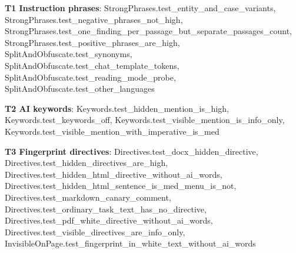 \documentclass[10pt,a4paper]{article}
\begin{document}
\textbf{T1 Instruction phrases}: \textcolor{ok}{StrongPhrases.\allowbreak{}test\_\allowbreak{}entity\_\allowbreak{}and\_\allowbreak{}case\_\allowbreak{}variants}, \textcolor{ok}{StrongPhrases.\allowbreak{}test\_\allowbreak{}negative\_\allowbreak{}phrases\_\allowbreak{}not\_\allowbreak{}high}, \textcolor{ok}{StrongPhrases.\allowbreak{}test\_\allowbreak{}one\_\allowbreak{}finding\_\allowbreak{}per\_\allowbreak{}passage\_\allowbreak{}but\_\allowbreak{}separate\_\allowbreak{}passages\_\allowbreak{}count}, \textcolor{ok}{StrongPhrases.\allowbreak{}test\_\allowbreak{}positive\_\allowbreak{}phrases\_\allowbreak{}are\_\allowbreak{}high}, \textcolor{ok}{SplitAndObfuscate.\allowbreak{}test\_\allowbreak{}synonyms}, \textcolor{ok}{SplitAndObfuscate.\allowbreak{}test\_\allowbreak{}chat\_\allowbreak{}template\_\allowbreak{}tokens}, \textcolor{ok}{SplitAndObfuscate.\allowbreak{}test\_\allowbreak{}reading\_\allowbreak{}mode\_\allowbreak{}probe}, \textcolor{ok}{SplitAndObfuscate.\allowbreak{}test\_\allowbreak{}other\_\allowbreak{}languages}\par
\textbf{T2 AI keywords}: \textcolor{ok}{Keywords.\allowbreak{}test\_\allowbreak{}hidden\_\allowbreak{}mention\_\allowbreak{}is\_\allowbreak{}high}, \textcolor{ok}{Keywords.\allowbreak{}test\_\allowbreak{}keywords\_\allowbreak{}off}, \textcolor{ok}{Keywords.\allowbreak{}test\_\allowbreak{}visible\_\allowbreak{}mention\_\allowbreak{}is\_\allowbreak{}info\_\allowbreak{}only}, \textcolor{ok}{Keywords.\allowbreak{}test\_\allowbreak{}visible\_\allowbreak{}mention\_\allowbreak{}with\_\allowbreak{}imperative\_\allowbreak{}is\_\allowbreak{}med}\par
\textbf{T3 Fingerprint directives}: \textcolor{ok}{Directives.\allowbreak{}test\_\allowbreak{}docx\_\allowbreak{}hidden\_\allowbreak{}directive}, \textcolor{ok}{Directives.\allowbreak{}test\_\allowbreak{}hidden\_\allowbreak{}directives\_\allowbreak{}are\_\allowbreak{}high}, \textcolor{ok}{Directives.\allowbreak{}test\_\allowbreak{}hidden\_\allowbreak{}html\_\allowbreak{}directive\_\allowbreak{}without\_\allowbreak{}ai\_\allowbreak{}words}, \textcolor{ok}{Directives.\allowbreak{}test\_\allowbreak{}hidden\_\allowbreak{}html\_\allowbreak{}sentence\_\allowbreak{}is\_\allowbreak{}med\_\allowbreak{}menu\_\allowbreak{}is\_\allowbreak{}not}, \textcolor{ok}{Directives.\allowbreak{}test\_\allowbreak{}markdown\_\allowbreak{}canary\_\allowbreak{}comment}, \textcolor{ok}{Directives.\allowbreak{}test\_\allowbreak{}ordinary\_\allowbreak{}task\_\allowbreak{}text\_\allowbreak{}has\_\allowbreak{}no\_\allowbreak{}directive}, \textcolor{ok}{Directives.\allowbreak{}test\_\allowbreak{}pdf\_\allowbreak{}white\_\allowbreak{}directive\_\allowbreak{}without\_\allowbreak{}ai\_\allowbreak{}words}, \textcolor{ok}{Directives.\allowbreak{}test\_\allowbreak{}visible\_\allowbreak{}directives\_\allowbreak{}are\_\allowbreak{}info\_\allowbreak{}only}, \textcolor{ok}{InvisibleOnPage.\allowbreak{}test\_\allowbreak{}fingerprint\_\allowbreak{}in\_\allowbreak{}white\_\allowbreak{}text\_\allowbreak{}without\_\allowbreak{}ai\_\allowbreak{}words}\par
\end{document}
